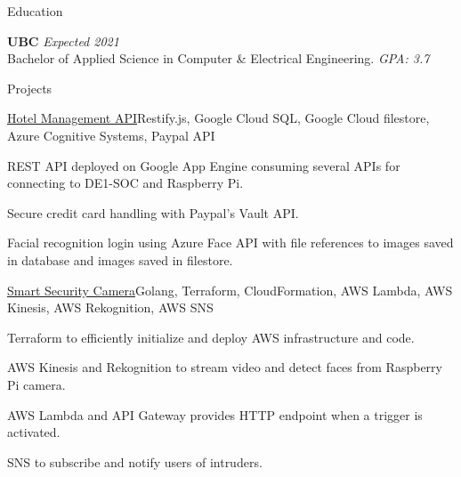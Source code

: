 \documentclass{resume} %
\begin{document}

\begin{rSection}{Education}

{\bf UBC} \hfill {\em Expected 2021} \\ 
  Bachelor of Applied Science in Computer \& Electrical Engineering. \hfill {\em GPA: 3.7}

\end{rSection}


\begin{rSection}{Projects}
\begin{multicols}{2}
  \begin{rSubsection}{\href{http://cpen-391.appspot.com}{Hotel Management API}}{}{Restify.js, Google Cloud SQL, Google Cloud filestore, Azure Cognitive Systems, Paypal API}{}
  \item REST API deployed on Google App Engine consuming several APIs for connecting to DE1-SOC and Raspberry Pi.
  \item Secure credit card handling with Paypal's Vault API.
  \item Facial recognition login using Azure Face API with file references to images saved in database and images saved in filestore.
\end{rSubsection}
\columnbreak %
  \begin{rSubsection}{\href{https://github.com/stevenshih1997/Hotel-Serverless}{Smart Security Camera}}{}{Golang, Terraform, CloudFormation, AWS Lambda, AWS Kinesis, AWS Rekognition, AWS SNS}{}
  \item Terraform to efficiently initialize and deploy AWS infrastructure and code.
  \item AWS Kinesis and Rekognition to stream video and detect faces from Raspberry Pi camera.
  \item AWS Lambda and API Gateway provides HTTP endpoint when a trigger is activated.
  \item SNS to subscribe and notify users of intruders.
\end{rSubsection}
\end{multicols}

\end{rSection}
\end{document}
